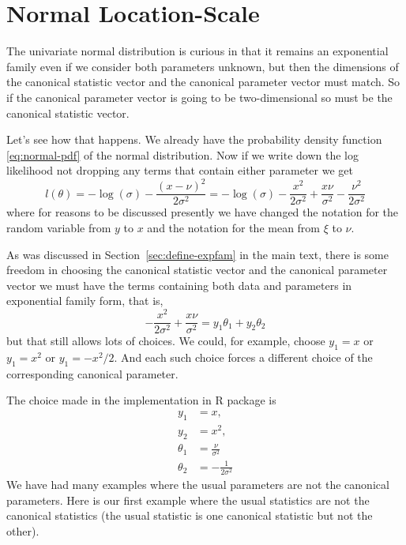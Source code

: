 \section{Normal Location-Scale}

The univariate normal distribution is curious in that it remains an exponential
family even if we consider both parameters unknown, but then
the dimensions of the canonical statistic vector and the canonical parameter
vector must match.  So if the canonical parameter vector is going to be
two-dimensional so must be the canonical statistic vector.

Let's see how that happens.  We already have the probability density
function \eqref{eq:normal-pdf} of the normal distribution.
Now if we write down the log likelihood not dropping any terms that contain
either parameter we get
\begin{equation} \label{eq:logl-normal-location-scale}
   l(\theta)
   =
   - \log(\sigma) - \frac{(x - \nu)^2}{2 \sigma^2}
   =
   - \log(\sigma) - \frac{x^2}{2 \sigma^2}
   + \frac{x \nu}{\sigma^2}
   - \frac{\nu^2}{2 \sigma^2}
\end{equation}
where for reasons to be discussed presently we have changed the notation
for the random variable from $y$ to $x$ and the notation
for the mean from $\xi$ to $\nu$.

As was discussed in Section~\ref{sec:define-expfam} in the main text,
there is some freedom in choosing the canonical statistic vector and
the canonical parameter vector we must have the terms containing both
data and parameters in exponential family form, that is,
$$
   - \frac{x^2}{2 \sigma^2} + \frac{x \nu}{\sigma^2}
   =
   y_1 \theta_1 + y_2 \theta_2
$$
but that still allows lots of choices.
We could, for example, choose $y_1 = x$ or $y_1 = x^2$ or $y_1 = - x^2 / 2$.
And each such choice forces a different choice of the corresponding
canonical parameter.

The choice made in the implementation in R package  is
\begin{align*}
   y_1 & = x,
   \\
   y_2 & = x^2,
   \\
   \theta_1 & = \frac{\nu}{\sigma^2}
   \\
   \theta_2 & = - \frac{1}{2 \sigma^2}
\end{align*}
We have had many examples where the usual parameters are not the canonical
parameters.  Here is our first example where the usual statistics are not
the canonical statistics (the usual statistic is one canonical statistic
but not the other).

